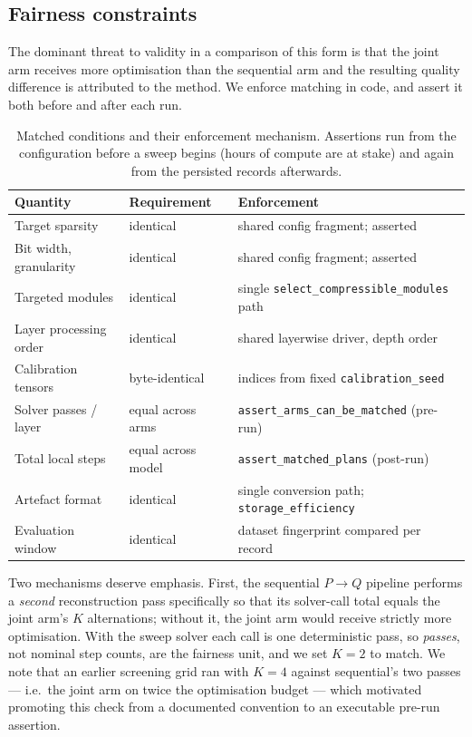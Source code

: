 \subsection{Fairness constraints}
\label{subsec:fairness}

The dominant threat to validity in a comparison of this form is that the joint arm receives
more optimisation than the sequential arm and the resulting quality difference is attributed
to the method. We enforce matching in code, and assert it both before and after each run.

\begin{table}[t]
\centering
\caption{Matched conditions and their enforcement mechanism. Assertions run from the
configuration before a sweep begins (hours of compute are at stake) and again from the
persisted records afterwards.}
\label{tab:fairness}
\begin{tabular}{@{}lll@{}}
\toprule
\textbf{Quantity} & \textbf{Requirement} & \textbf{Enforcement} \\
\midrule
Target sparsity        & identical            & shared config fragment; asserted \\
Bit width, granularity & identical            & shared config fragment; asserted \\
Targeted modules       & identical            & single \texttt{select\_compressible\_modules} path \\
Layer processing order & identical            & shared layerwise driver, depth order \\
Calibration tensors    & byte-identical       & indices from fixed \texttt{calibration\_seed} \\
Solver passes / layer  & equal across arms    & \texttt{assert\_arms\_can\_be\_matched} (pre-run) \\
Total local steps      & equal across model   & \texttt{assert\_matched\_plans} (post-run) \\
Artefact format        & identical            & single conversion path; \texttt{storage\_efficiency} \\
Evaluation window      & identical            & dataset fingerprint compared per record \\
\bottomrule
\end{tabular}
\end{table}

Two mechanisms deserve emphasis. First, the sequential $P\!\rightarrow\!Q$ pipeline performs
a \emph{second} reconstruction pass specifically so that its solver-call total equals the
joint arm's $K$ alternations; without it, the joint arm would receive strictly more
optimisation. With the sweep solver each call is one deterministic pass, so \emph{passes},
not nominal step counts, are the fairness unit, and we set $K = 2$ to match. We note that an
earlier screening grid ran with $K = 4$ against sequential's two passes --- i.e.\ the joint
arm on twice the optimisation budget --- which motivated promoting this check from a
documented convention to an executable pre-run assertion.

